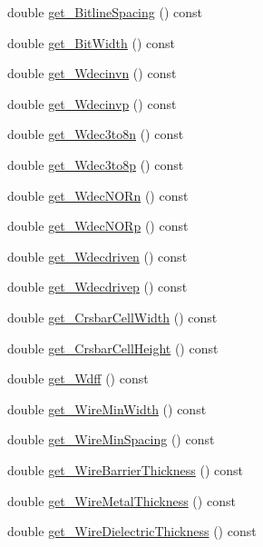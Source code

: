 \begin{DoxyCompactItemize}
\item 
double \hyperlink{classTechParameter_aafc853eac37f360c07f4797e6e9d60b2}{get\_\-BitlineSpacing} () const 
\item 
double \hyperlink{classTechParameter_afe14a6080452851a379b4603f8f4c5a9}{get\_\-BitWidth} () const 
\item 
double \hyperlink{classTechParameter_a9e908dc77e54b76dadc9d8d85afb2644}{get\_\-Wdecinvn} () const 
\item 
double \hyperlink{classTechParameter_af1bceed7662500febd833e6ae3a0ddac}{get\_\-Wdecinvp} () const 
\item 
double \hyperlink{classTechParameter_aa37a3e433e3819ca1be24020459b8a3f}{get\_\-Wdec3to8n} () const 
\item 
double \hyperlink{classTechParameter_a57e88d3932c7b1a760a3066897061395}{get\_\-Wdec3to8p} () const 
\item 
double \hyperlink{classTechParameter_a9453c95155403fcab792b60e8f1e61fe}{get\_\-WdecNORn} () const 
\item 
double \hyperlink{classTechParameter_aa9e8806878c45b3d37eb1296d77edb89}{get\_\-WdecNORp} () const 
\item 
double \hyperlink{classTechParameter_a09fa1bc016056f66b47886ea672ff688}{get\_\-Wdecdriven} () const 
\item 
double \hyperlink{classTechParameter_a3197340c0f3b518e9a7dfa001528d9ba}{get\_\-Wdecdrivep} () const 
\item 
double \hyperlink{classTechParameter_a47d7ed7a25d1baec0ac3e63f883284a9}{get\_\-CrsbarCellWidth} () const 
\item 
double \hyperlink{classTechParameter_a1bcb1c120a0445ea03c447abc8cd8f16}{get\_\-CrsbarCellHeight} () const 
\item 
double \hyperlink{classTechParameter_a861cfe465f1df26c66ff4075f4935870}{get\_\-Wdff} () const 
\item 
double \hyperlink{classTechParameter_a01073ecad479898141a113610ad892c2}{get\_\-WireMinWidth} () const 
\item 
double \hyperlink{classTechParameter_af8c4a3ffdd1717cfc0c6374a5ff9f240}{get\_\-WireMinSpacing} () const 
\item 
double \hyperlink{classTechParameter_a705db86cf613cea77401a067b08fcb43}{get\_\-WireBarrierThickness} () const 
\item 
double \hyperlink{classTechParameter_ad1049c00d11342d2bb09cb06f719110b}{get\_\-WireMetalThickness} () const 
\item 
double \hyperlink{classTechParameter_a9a19b59fa12b77c8941b600850dc48e3}{get\_\-WireDielectricThickness} () const 

\end{DoxyCompactItemize}
